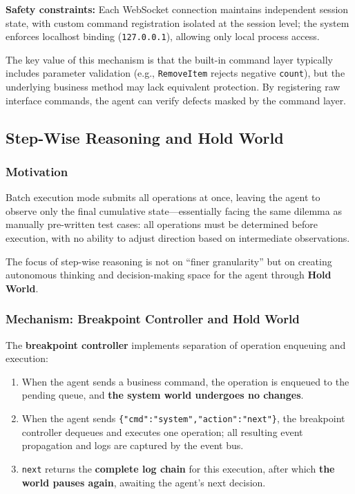 \documentclass[sigconf,nonacm]{acmart}
\begin{document}
\textbf{Safety constraints:} Each WebSocket connection maintains independent session state, with custom command registration isolated at the session level; the system enforces localhost binding (\texttt{127.0.0.1}), allowing only local process access.

The key value of this mechanism is that the built-in command layer typically includes parameter validation (e.g., \texttt{RemoveItem} rejects negative \texttt{count}), but the underlying business method may lack equivalent protection. By registering raw interface commands, the agent can verify defects masked by the command layer.

\subsection{Step-Wise Reasoning and Hold World}

\subsubsection{Motivation}

Batch execution mode submits all operations at once, leaving the agent to observe only the final cumulative state---essentially facing the same dilemma as manually pre-written test cases: all operations must be determined before execution, with no ability to adjust direction based on intermediate observations.

The focus of step-wise reasoning is not on ``finer granularity'' but on creating autonomous thinking and decision-making space for the agent through \textbf{Hold World}.

\subsubsection{Mechanism: Breakpoint Controller and Hold World}

The \textbf{breakpoint controller} implements separation of operation enqueuing and execution:

\begin{enumerate}
\item When the agent sends a business command, the operation is enqueued to the pending queue, and \textbf{the system world undergoes no changes}.
\item When the agent sends \texttt{\{"cmd":"system","action":"next"\}}, the breakpoint controller dequeues and executes one operation; all resulting event propagation and logs are captured by the event bus.
\item \texttt{next} returns the \textbf{complete log chain} for this execution, after which \textbf{the world pauses again}, awaiting the agent's next decision.
\end{enumerate}
\end{document}
